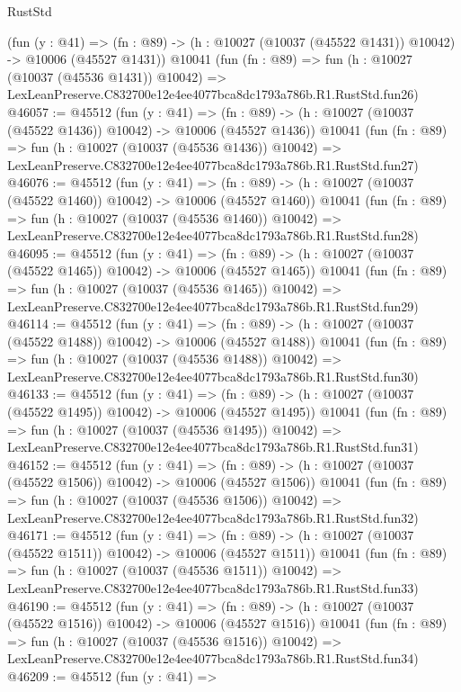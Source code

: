 \begin{lexlean}{RustStd}
\begin{coremodule}
    (fun (y : @41) =>
    (fn : @89) -> (h : @10027 (@10037 (@45522 @1431)) @10042) -> @10006 (@45527 @1431))
    @10041
    (fun (fn : @89) =>
    fun (h : @10027 (@10037 (@45536 @1431)) @10042) =>
    LexLeanPreserve.C832700e12e4ee4077bca8dc1793a786b.R1.RustStd.fun26)
@46057 := @45512
    (fun (y : @41) =>
    (fn : @89) -> (h : @10027 (@10037 (@45522 @1436)) @10042) -> @10006 (@45527 @1436))
    @10041
    (fun (fn : @89) =>
    fun (h : @10027 (@10037 (@45536 @1436)) @10042) =>
    LexLeanPreserve.C832700e12e4ee4077bca8dc1793a786b.R1.RustStd.fun27)
@46076 := @45512
    (fun (y : @41) =>
    (fn : @89) -> (h : @10027 (@10037 (@45522 @1460)) @10042) -> @10006 (@45527 @1460))
    @10041
    (fun (fn : @89) =>
    fun (h : @10027 (@10037 (@45536 @1460)) @10042) =>
    LexLeanPreserve.C832700e12e4ee4077bca8dc1793a786b.R1.RustStd.fun28)
@46095 := @45512
    (fun (y : @41) =>
    (fn : @89) -> (h : @10027 (@10037 (@45522 @1465)) @10042) -> @10006 (@45527 @1465))
    @10041
    (fun (fn : @89) =>
    fun (h : @10027 (@10037 (@45536 @1465)) @10042) =>
    LexLeanPreserve.C832700e12e4ee4077bca8dc1793a786b.R1.RustStd.fun29)
@46114 := @45512
    (fun (y : @41) =>
    (fn : @89) -> (h : @10027 (@10037 (@45522 @1488)) @10042) -> @10006 (@45527 @1488))
    @10041
    (fun (fn : @89) =>
    fun (h : @10027 (@10037 (@45536 @1488)) @10042) =>
    LexLeanPreserve.C832700e12e4ee4077bca8dc1793a786b.R1.RustStd.fun30)
@46133 := @45512
    (fun (y : @41) =>
    (fn : @89) -> (h : @10027 (@10037 (@45522 @1495)) @10042) -> @10006 (@45527 @1495))
    @10041
    (fun (fn : @89) =>
    fun (h : @10027 (@10037 (@45536 @1495)) @10042) =>
    LexLeanPreserve.C832700e12e4ee4077bca8dc1793a786b.R1.RustStd.fun31)
@46152 := @45512
    (fun (y : @41) =>
    (fn : @89) -> (h : @10027 (@10037 (@45522 @1506)) @10042) -> @10006 (@45527 @1506))
    @10041
    (fun (fn : @89) =>
    fun (h : @10027 (@10037 (@45536 @1506)) @10042) =>
    LexLeanPreserve.C832700e12e4ee4077bca8dc1793a786b.R1.RustStd.fun32)
@46171 := @45512
    (fun (y : @41) =>
    (fn : @89) -> (h : @10027 (@10037 (@45522 @1511)) @10042) -> @10006 (@45527 @1511))
    @10041
    (fun (fn : @89) =>
    fun (h : @10027 (@10037 (@45536 @1511)) @10042) =>
    LexLeanPreserve.C832700e12e4ee4077bca8dc1793a786b.R1.RustStd.fun33)
@46190 := @45512
    (fun (y : @41) =>
    (fn : @89) -> (h : @10027 (@10037 (@45522 @1516)) @10042) -> @10006 (@45527 @1516))
    @10041
    (fun (fn : @89) =>
    fun (h : @10027 (@10037 (@45536 @1516)) @10042) =>
    LexLeanPreserve.C832700e12e4ee4077bca8dc1793a786b.R1.RustStd.fun34)
@46209 := @45512
    (fun (y : @41) =>

\end{coremodule}
\end{lexlean}
